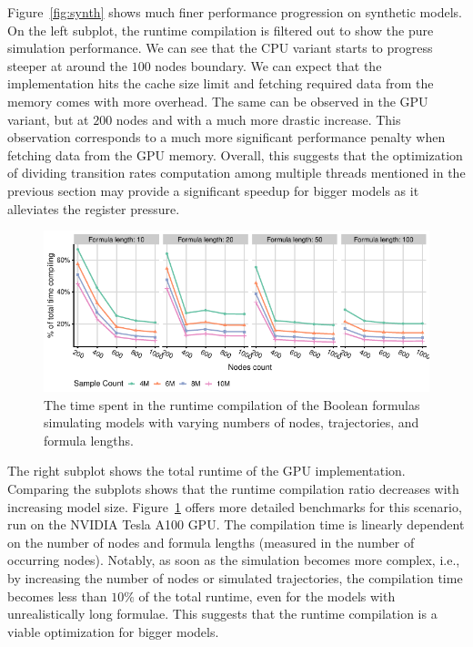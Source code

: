 \documentclass[times, twoside]{zHenriquesLab-StyleBioRxiv}
\begin{document}
Figure~\ref{fig:synth} shows much finer performance progression on synthetic models. On the left subplot, the runtime compilation is filtered out to show the pure simulation performance. We can see that the CPU variant starts to progress steeper at around the $100$ nodes boundary. We can expect that the implementation hits the cache size limit and fetching required data from the memory comes with more overhead. The same can be observed in the GPU variant, but at $200$ nodes and with a much more drastic increase. This observation corresponds to a much more significant performance penalty when fetching data from the GPU memory. Overall, this suggests that the optimization of dividing transition rates computation among multiple threads mentioned in the previous section may provide a significant speedup for bigger models as it alleviates the register pressure.

\begin{figure}
    \centering
    \includegraphics[width=\linewidth]{Figures/nodes-compilation-big-NVIDIA Tesla A100 GPU.pdf}
    \caption{The time spent in the runtime compilation of the Boolean formulas simulating models with varying numbers of nodes, trajectories, and formula lengths.}
    \label{fig:comp}
\end{figure}

The right subplot shows the total runtime of the GPU implementation. Comparing the subplots shows that the runtime compilation ratio decreases with increasing model size. Figure~\ref{fig:comp} offers more detailed benchmarks for this scenario, run on the NVIDIA Tesla A100 GPU. The compilation time is linearly dependent on the number of nodes and formula lengths (measured in the number of occurring nodes). Notably, as soon as the simulation becomes more complex, i.e., by increasing the number of nodes or simulated trajectories, the compilation time becomes less than $10\%$ of the total runtime, even for the models with unrealistically long formulae. This suggests that the runtime compilation is a viable optimization for bigger models.
\end{document}
